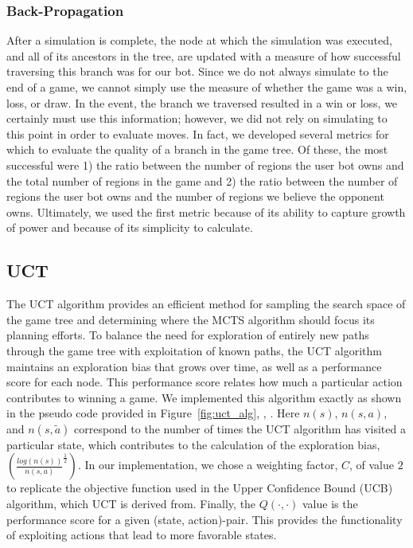 \documentclass[a4paper,11pt]{article}
\begin{document}
\subsubsection{Back-Propagation}
After a simulation is complete, the node at which the simulation was executed, and all of its 
ancestors in the tree, are updated with a measure of how successful traversing this branch was 
for our bot. Since we do not always simulate to the end of a game, we cannot simply use the measure
of whether the game was a win, loss, or draw.  In the event, the branch we traversed resulted in a win
or loss, we certainly must use this information; however, we did not rely on simulating to this point
in order to evaluate moves. In fact, we developed several metrics for which to evaluate
the quality of a branch in the game tree.  Of these, the most successful were 1) the ratio between 
the number of regions the user bot owns and the total number of regions in the game and 2) the 
ratio between the number of regions the user bot owns  and the number of regions we believe the 
opponent owns.  Ultimately, we used the first metric because of its ability to capture growth of 
power and because of its simplicity to calculate.  


\subsection{UCT}\label{sec:uct}
The UCT algorithm provides an efficient method for sampling the search space of the game tree and 
determining where the MCTS algorithm should focus its planning efforts. To balance the need for 
exploration of entirely new paths through the game tree with exploitation of known paths, the UCT 
algorithm maintains an exploration bias that grows over time, as well as a performance score for each node. 
This performance score relates how much a particular action contributes to winning a game.
We implemented this algorithm exactly as shown in the pseudo code provided in Figure~\ref{fig:uct_alg}, 
\cite{Nau2015}, \cite{NauLecture}. Here $n(s)$, $n(s,a)$, and $n(s,\tilde{a})$ correspond to the number of 
times the UCT algorithm has visited a particular state, which contributes to the calculation of the 
exploration bias, $(\frac{log(n(s))}{n(s,a)}^{\frac{1}{2}})$. In our implementation, we chose a weighting 
factor, $C$, of value $2$ to replicate the objective function used in the Upper Confidence Bound (UCB) 
algorithm, which UCT is derived from. Finally, the $Q(\cdot, \cdot)$ value is the performance score for
a given (state, action)-pair.  This provides the functionality of exploiting actions that lead to more 
favorable states.
\end{document}
